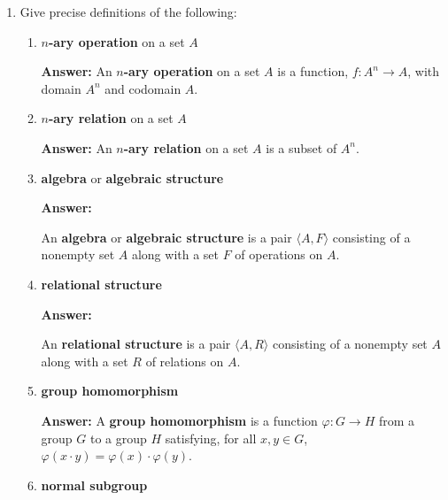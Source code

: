 \documentclass[fleqn,12pt]{article}
\newcommand{\<}{\ensuremath{\langle}}
\renewcommand{\>}{\ensuremath{\rangle}}
\begin{document}
\newpage
\begin{enumerate}[{\bf 1.}]
\item Give precise definitions of the following:

  \begin{enumerate}
  \item {\bf $n$-ary operation} on a set $A$

    \medskip

    {\bf Answer:} 
    An {\bf $n$-ary operation} on a set $A$ is a function,
    $f: A^n \rightarrow A$, with domain $A^n$ and codomain $A$.

    \bigskip

  \item {\bf $n$-ary relation} on a set $A$

    \medskip

    {\bf Answer:} 
    An {\bf $n$-ary relation} on a set $A$ is a subset of $A^n$.

    \bigskip

  \item {\bf algebra} or {\bf algebraic structure}

    \medskip

    {\bf Answer:} 

    An {\bf algebra} or {\bf algebraic structure} is a pair $\<A, F\>$ consisting of a
    nonempty set $A$ along with a set $F$ of operations on $A$.

    \bigskip

  \item {\bf relational structure}

    \medskip

    {\bf Answer:} 

    An {\bf relational structure} is a pair $\<A, R\>$ consisting of a
    nonempty set $A$ along with a set $R$ of relations on $A$.

    \bigskip

  \item {\bf group homomorphism}

    \medskip

    {\bf Answer:} A {\bf group homomorphism} is a function 
    $\varphi: G \rightarrow H$ from a group $G$ to a group $H$ satisfying,
    for all $x, y \in G$, $\varphi(x\cdot y) = \varphi(x) \cdot \varphi(y)$.

    \bigskip

  \item {\bf normal subgroup}
    \medskip


\end{enumerate}
\end{enumerate}
\end{document}

